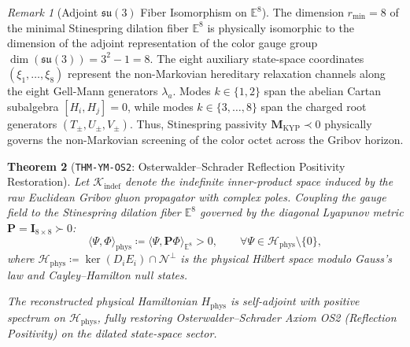 \documentclass[11pt,a4paper,reqno]{article}
\theoremstyle{plain}
\newtheorem{theorem}{Theorem}[section]
\theoremstyle{definition}
\theoremstyle{remark}
\newtheorem{remark}[theorem]{Remark}
\numberwithin{equation}{section}
\begin{document}
\begin{remark}[Adjoint $\mathfrak{su}(3)$ Fiber Isomorphism on $\mathbb{E}^8$]
\label{rem:adjoint_su3_fiber}
The dimension $r_{\min} = 8$ of the minimal Stinespring dilation fiber $\mathbb{E}^8$ is physically isomorphic to the dimension of the adjoint representation of the color gauge group $\dim(\mathfrak{su}(3)) = 3^2 - 1 = 8$. The eight auxiliary state-space coordinates $(\xi_1, \dots, \xi_8)$ represent the non-Markovian hereditary relaxation channels along the eight Gell-Mann generators $\lambda_a$. Modes $k \in \{1, 2\}$ span the abelian Cartan subalgebra $[H_i, H_j] = 0$, while modes $k \in \{3, \dots, 8\}$ span the charged root generators $(T_\pm, U_\pm, V_\pm)$. Thus, Stinespring passivity $\mathbf{M}_{\mathrm{KYP}} \prec 0$ physically governs the non-Markovian screening of the color octet across the Gribov horizon.
\end{remark}

\begin{theorem}[\texttt{THM-YM-OS2}: Osterwalder--Schrader Reflection Positivity Restoration]
\label{thm:ym_reflection_positivity}
Let $\mathcal{K}_{\mathrm{indef}}$ denote the indefinite inner-product space induced by the raw Euclidean Gribov gluon propagator with complex poles. Coupling the gauge field to the Stinespring dilation fiber $\mathbb{E}^8$ governed by the diagonal Lyapunov metric $\mathbf{P} = \mathbf{I}_{8 \times 8} \succ 0$:
\begin{equation}
  \langle \Psi, \Phi \rangle_{\mathrm{phys}} \coloneqq \langle \Psi, \mathbf{P} \Phi \rangle_{\mathbb{E}^8} > 0, \qquad \forall \Psi \in \mathcal{H}_{\mathrm{phys}} \setminus \{0\},
\end{equation}
where $\mathcal{H}_{\mathrm{phys}} \coloneqq \operatorname{ker}(D_i E_i) \cap \mathcal{N}^\perp$ is the physical Hilbert space modulo Gauss's law and Cayley--Hamilton null states. 

The reconstructed physical Hamiltonian $H_{\mathrm{phys}}$ is self-adjoint with positive spectrum on $\mathcal{H}_{\mathrm{phys}}$, fully restoring Osterwalder--Schrader Axiom OS2 (Reflection Positivity) on the dilated state-space sector.
\end{theorem}
\end{document}
